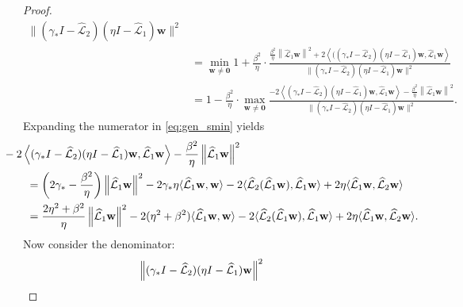 \documentclass[review]{siamart}
\begin{document}
\begin{proof}
{\begin{align}
	{\|(\gamma_* I- \widehat{\mathcal{L}}_2)(\eta I- \widehat{\mathcal{L}}_1)\mathbf{w}\|^2} \nonumber\\
& = \min_{\mathbf{w}\neq\mathbf{0}} 1 +
	\frac{\beta^2}{\eta}\cdot
	\frac{\frac{\beta^2}{\eta}\left\|\widehat{\mathcal{L}}_1\mathbf{w} \right\|^2
		+ 2\left\langle((\gamma_* I- \widehat{\mathcal{L}}_2)(\eta I- \widehat{\mathcal{L}}_1)\mathbf{w},
		\widehat{\mathcal{L}}_1\mathbf{w} \right\rangle}
	{\|(\gamma_* I- \widehat{\mathcal{L}}_2)(\eta I- \widehat{\mathcal{L}}_1)\mathbf{w}\|^2} \nonumber\\
& = 1 - \frac{\beta^2}{\eta} \cdot\max_{\mathbf{w}\neq\mathbf{0}}
	\frac{-2\left\langle(\gamma_* I- \widehat{\mathcal{L}}_2)(\eta I- \widehat{\mathcal{L}}_1)\mathbf{w},
		\widehat{\mathcal{L}}_1\mathbf{w} \right\rangle-
		\frac{\beta^2}{\eta}\left\|\widehat{\mathcal{L}}_1\mathbf{w} \right\|^2}
	{\|(\gamma_* I- \widehat{\mathcal{L}}_2)(\eta I- \widehat{\mathcal{L}}_1)\mathbf{w}\|^2}.
	\label{eq:gen_smin}
\end{align}
}
%
Expanding the numerator in \eqref{eq:gen_smin} yields
{\small
\begin{align}\nonumber
& \hspace{-5ex}-2\left\langle(\gamma_* I- \widehat{\mathcal{L}}_2)(\eta I- \widehat{\mathcal{L}}_1)\mathbf{w},
		\widehat{\mathcal{L}}_1\mathbf{w} \right\rangle-
		\frac{\beta^2}{\eta}\left\|\widehat{\mathcal{L}}_1\mathbf{w} \right\|^2 \\
& = \left(2\gamma_* - \frac{\beta^2}{\eta}\right)
			\left\|\widehat{\mathcal{L}}_1\mathbf{w} \right\|^2
		- 2\gamma_*\eta\langle \widehat{\mathcal{L}}_1\mathbf{w},\mathbf{w}\rangle
		- 2\langle\widehat{\mathcal{L}}_2(\widehat{\mathcal{L}}_1\mathbf{w}),\widehat{\mathcal{L}}_1\mathbf{w}\rangle
		+ 2\eta\langle\widehat{\mathcal{L}}_1\mathbf{w},\widehat{\mathcal{L}}_2\mathbf{w}\rangle \nonumber\\
& = \frac{2\eta^2+\beta^2}{\eta}
			\left\|\widehat{\mathcal{L}}_1\mathbf{w} \right\|^2
		- 2(\eta^2+\beta^2)\langle \widehat{\mathcal{L}}_1\mathbf{w},\mathbf{w}\rangle
		- 2\langle\widehat{\mathcal{L}}_2(\widehat{\mathcal{L}}_1\mathbf{w}),\widehat{\mathcal{L}}_1\mathbf{w}\rangle
		+ 2\eta\langle\widehat{\mathcal{L}}_1\mathbf{w},\widehat{\mathcal{L}}_2\mathbf{w}\rangle.
		\label{eq:num_gen}
\end{align}
}
%
Now consider the denominator:
%
\begin{align}
& \hspace{-7ex}
\left\|(\gamma_* I- \widehat{\mathcal{L}}_2)(\eta I- \widehat{\mathcal{L}}_1)\mathbf{w}\right\|^2

\end{align}
\end{proof}
\end{document}
